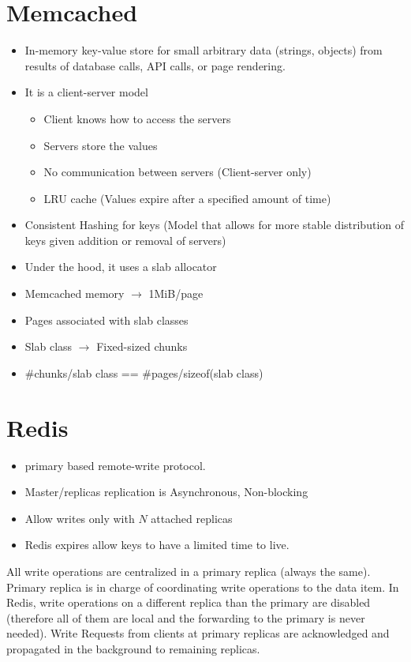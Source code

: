 \section{Memcached}
\begin{itemize}
  \item In-memory key-value store for small arbitrary data (strings, objects) from results of database calls, API calls, or page rendering.
  \item It is a client-server model
  \begin{itemize}
    \item Client knows how to access the servers
    \item Servers store the values
    \item No communication between servers (Client-server only)
  \item  LRU cache (Values expire after a specified amount of time)
  \end{itemize}
  \item Consistent Hashing for keys (Model that allows for more stable distribution of keys given addition or removal of servers)
  \item Under the hood, it uses a slab allocator
\item Memcached memory $\rightarrow$ 1MiB/page
\item Pages associated with slab classes
\item Slab class $\rightarrow$ Fixed-sized chunks
\item \#chunks/slab class == \#pages/sizeof(slab class)
\end{itemize}



\section{Redis}
\begin{itemize}
\item primary based remote-write protocol.
  \item Master/replicas replication is Asynchronous,
 Non-blocking

  \item Allow writes only with \(N\) attached replicas
  \item Redis expires allow keys to have a limited time to live.
  \end{itemize}
All write operations are centralized in a primary replica (always the same). Primary replica is in charge of coordinating write operations to the data item. In Redis, write operations on a different replica than the primary are disabled (therefore all of them are local and the forwarding to the primary is never needed). Write Requests from clients at primary replicas are acknowledged and propagated in the background to remaining replicas.
